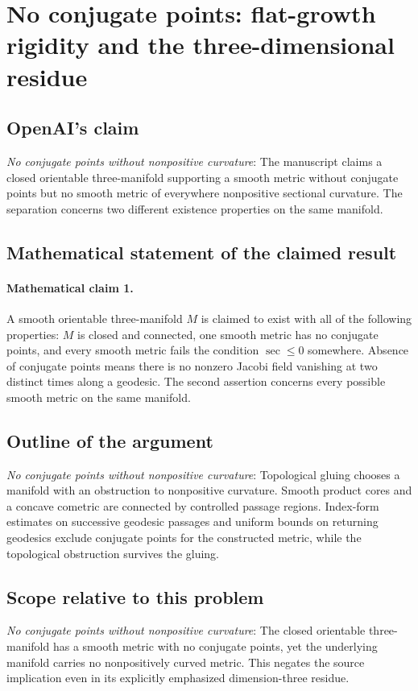 \documentclass[11pt]{article}
\begin{document}
\section*{No conjugate points: flat-growth rigidity and the three-dimensional residue}

\subsection{OpenAI's claim}
\textit{No conjugate points without nonpositive curvature}: The manuscript claims a closed orientable three-manifold supporting a smooth metric without conjugate points but no smooth metric of everywhere nonpositive sectional curvature. The separation concerns two different existence properties on the same manifold.

\subsection{Mathematical statement of the claimed result}
\paragraph{Mathematical claim 1.} A smooth orientable three-manifold $M$ is claimed to exist with all of the following properties: $M$ is closed and connected, one smooth metric has no conjugate points, and every smooth metric fails the condition $\sec\le0$ somewhere. Absence of conjugate points means there is no nonzero Jacobi field vanishing at two distinct times along a geodesic. The second assertion concerns every possible smooth metric on the same manifold.

\subsection{Outline of the argument}
\textit{No conjugate points without nonpositive curvature}: Topological gluing chooses a manifold with an obstruction to nonpositive curvature. Smooth product cores and a concave cometric are connected by controlled passage regions. Index-form estimates on successive geodesic passages and uniform bounds on returning geodesics exclude conjugate points for the constructed metric, while the topological obstruction survives the gluing.

\subsection{Scope relative to this problem}
\textit{No conjugate points without nonpositive curvature}: The closed orientable three-manifold has a smooth metric with no conjugate points, yet the underlying manifold carries no nonpositively curved metric. This negates the source implication even in its explicitly emphasized dimension-three residue.
\end{document}
